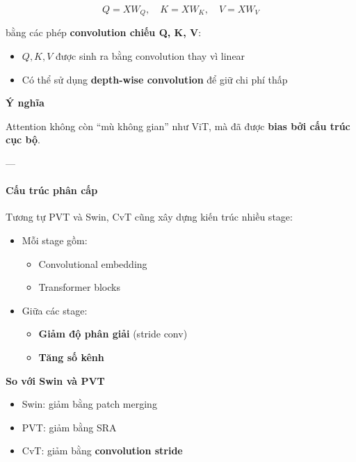 \[
Q = XW_Q,\quad K = XW_K,\quad V = XW_V
\]

bằng các phép \textbf{convolution chiếu Q, K, V}:

\begin{itemize}
	\item $Q, K, V$ được sinh ra bằng convolution thay vì linear
	\item Có thể sử dụng \textbf{depth-wise convolution} để giữ chi phí thấp
\end{itemize}

\begin{mdframed}[style=infobox]
	\textbf{Ý nghĩa}
	
	Attention không còn “mù không gian” như ViT, mà đã được \textbf{bias bởi cấu trúc cục bộ}.
\end{mdframed}

---

\paragraph{Cấu trúc phân cấp}

Tương tự PVT và Swin, CvT cũng xây dựng kiến trúc nhiều stage:

\begin{itemize}
	\item Mỗi stage gồm:
	\begin{itemize}
		\item Convolutional embedding
		\item Transformer blocks
	\end{itemize}
	\item Giữa các stage:
	\begin{itemize}
		\item \textbf{Giảm độ phân giải} (stride conv)
		\item \textbf{Tăng số kênh}
	\end{itemize}
\end{itemize}

\begin{mdframed}[style=infobox]
	\textbf{So với Swin và PVT}
	
	\begin{itemize}
		\item Swin: giảm bằng patch merging
		\item PVT: giảm bằng SRA
		\item CvT: giảm bằng \textbf{convolution stride}
	\end{itemize}
\end{mdframed}

